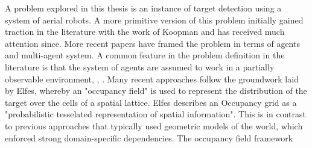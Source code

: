 \workinprogress

A problem explored in this thesis is an instance of target detection using a system of aerial robots. A more primitive version of this problem initially gained traction in the literature with the work of Koopman \cite{KoopmanTheoryOfSearchTargetDetection} and has received much attention since. More recent papers have framed the problem in terms of agents and multi-agent system. %
A common feature in the problem definition in the literature is that the system of agents are assumed to work in a partially observable environment\cite{Symington2010ProbabilisticRAVs}, \cite{Chung2008Multi-agentFramework}, \cite{WongMulti-vehicleTargets}. Many recent approaches follow the groundwork laid by Elfes\cite{ElfesUsingNavigation}, whereby an "occupancy field" is used to represent the distribution of the target over the cells of a spatial lattice. Elfes describes an Occupancy grid as a "probabilistic tesselated representation of spatial information". This is in contrast to previous approaches that typically used geometric models of the world, which enforced strong domain-specific dependencies. The occupancy field framework 
\par